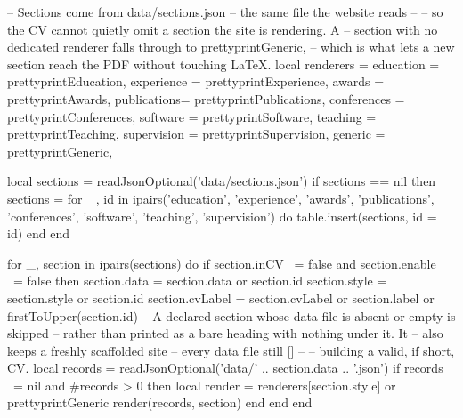 \documentclass[letterpaper, 10pt]{article}
\begin{document}
\begin{luacode}
	-- Sections come from data/sections.json -- the same file the website reads
	-- -- so the CV cannot quietly omit a section the site is rendering. A
	-- section with no dedicated renderer falls through to prettyprintGeneric,
	-- which is what lets a new section reach the PDF without touching LaTeX.
	local renderers = {
		education   = prettyprintEducation,
		experience  = prettyprintExperience,
		awards      = prettyprintAwards,
		publications= prettyprintPublications,
		conferences = prettyprintConferences,
		software    = prettyprintSoftware,
		teaching    = prettyprintTeaching,
		supervision = prettyprintSupervision,
		generic     = prettyprintGeneric,
	}

	local sections = readJsonOptional('data/sections.json')
	if sections == nil then
		sections = {}
		for _, id in ipairs({'education', 'experience', 'awards', 'publications',
		                     'conferences', 'software', 'teaching', 'supervision'}) do
			table.insert(sections, {id = id})
		end
	end

	for _, section in ipairs(sections) do
		if section.inCV ~= false and section.enable ~= false then
			section.data     = section.data or section.id
			section.style    = section.style or section.id
			section.cvLabel  = section.cvLabel or section.label or firstToUpper(section.id)
			-- A declared section whose data file is absent or empty is skipped
			-- rather than printed as a bare heading with nothing under it. It
			-- also keeps a freshly scaffolded site -- every data file still []
			-- -- building a valid, if short, CV.
			local records = readJsonOptional('data/' .. section.data .. '.json')
			if records ~= nil and #records > 0 then
				local render = renderers[section.style] or prettyprintGeneric
				render(records, section)
			end
		end
	end
\end{luacode}
\end{document}
